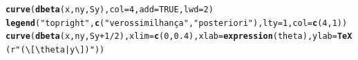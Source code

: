 \documentclass[11pt,a4]{article}\usepackage[]{graphicx}\usepackage[]{xcolor}
\makeatletter
\newcommand{\hlnum}[1]{\textcolor[rgb]{0.686,0.059,0.569}{#1}}%
\newcommand{\hlsng}[1]{\textcolor[rgb]{0.192,0.494,0.8}{#1}}%
\newcommand{\hlopt}[1]{\textcolor[rgb]{0,0,0}{#1}}%
\newcommand{\hldef}[1]{\textcolor[rgb]{0.345,0.345,0.345}{#1}}%
\newcommand{\hlkwc}[1]{\textcolor[rgb]{0.333,0.667,0.333}{#1}}%
\newcommand{\hlkwd}[1]{\textcolor[rgb]{0.737,0.353,0.396}{\textbf{#1}}}%
\newenvironment{kframe}{%
 \def\at@end@of@kframe{}%
 \ifinner\ifhmode%
  \def\at@end@of@kframe{\end{minipage}}%
  \begin{minipage}{\columnwidth}%
 \fi\fi%
 \def\FrameCommand##1{\hskip\@totalleftmargin \hskip-\fboxsep
 \colorbox{shadecolor}{##1}\hskip-\fboxsep
     \hskip-\linewidth \hskip-\@totalleftmargin \hskip\columnwidth}%
 \MakeFramed {\advance\hsize-\width
   \@totalleftmargin\z@ \linewidth\hsize
   \@setminipage}}%
 {\par\unskip\endMakeFramed%
 \at@end@of@kframe}
\newenvironment{knitrout}{}{} %
\makeatother
\begin{document}
\begin{enumerate}
\begin{solucao}
\begin{knitrout}
\begin{kframe}
{\ttfamily\noindent\bfseries\color{errorcolor}{\#\# Error in `str\_replace\_all()`:\\\#\# ! `replacement` function must return a vector the same length as the input (2), not length 1.}}\begin{alltt}
\hlkwd{curve}\hldef{(}\hlkwd{dbeta}\hldef{(x, ny, Sy),} \hlkwc{col} \hldef{=} \hlnum{4}\hldef{,} \hlkwc{add} \hldef{=} \hlnum{TRUE}\hldef{,} \hlkwc{lwd} \hldef{=} \hlnum{2}\hldef{)}
\hlkwd{legend}\hldef{(}\hlsng{"topright"}\hldef{,} \hlkwd{c}\hldef{(}\hlsng{"verossimilhança"}\hldef{,}\hlsng{"posteriori"}\hldef{),} \hlkwc{lty} \hldef{=} \hlnum{1}\hldef{,} \hlkwc{col} \hldef{=} \hlkwd{c}\hldef{(}\hlnum{4}\hldef{,}\hlnum{1}\hldef{))}
\hlkwd{curve}\hldef{(}\hlkwd{dbeta}\hldef{(x, ny, Sy} \hlopt{+} \hlnum{1}\hlopt{/}\hlnum{2}\hldef{),} \hlkwc{xlim} \hldef{=} \hlkwd{c}\hldef{(}\hlnum{0}\hldef{,} \hlnum{0.4}\hldef{),} \hlkwc{xlab} \hldef{=} \hlkwd{expression}\hldef{(theta),} \hlkwc{ylab} \hldef{=} \hlkwd{TeX}\hldef{(}\hlsng{r"(\textbackslash{}[\textbackslash{}theta|y\textbackslash{}])"}\hldef{))}
\end{alltt}


{\ttfamily\noindent{}}


\end{kframe}
\end{knitrout}
\end{solucao}
\end{enumerate}
\end{document}
